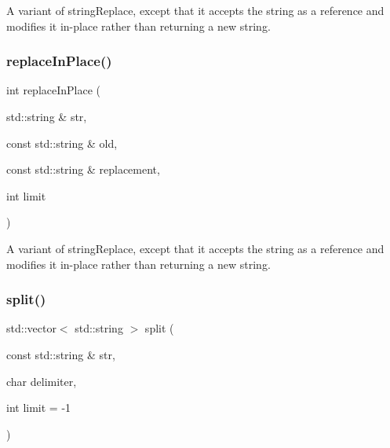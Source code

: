 A variant of string\+Replace, except that it accepts the string as a reference and modifies it in-\/place rather than returning a new string. 

\mbox{\label{namespacesgl_1_1priv_1_1strlib_a96605c78e69e67a8bd3909f7969fe8cf}} 
\subsubsection{\texorpdfstring{replace\+In\+Place()}{replaceInPlace()}\hspace{0.1cm}{\footnotesize\ttfamily [2/2]}}
{\footnotesize\ttfamily int replace\+In\+Place (\begin{DoxyParamCaption}\item[{std\+::string \&}]{str,  }\item[{const std\+::string \&}]{old,  }\item[{const std\+::string \&}]{replacement,  }\item[{int}]{limit }\end{DoxyParamCaption})}



A variant of string\+Replace, except that it accepts the string as a reference and modifies it in-\/place rather than returning a new string. 

\mbox{\label{namespacesgl_1_1priv_1_1strlib_ad26db0032c572d1b848ca89b98cf6cab}} 
\subsubsection{\texorpdfstring{split()}{split()}\hspace{0.1cm}{\footnotesize\ttfamily [1/2]}}
{\footnotesize\ttfamily std\+::vector$<$ std\+::string $>$ split (\begin{DoxyParamCaption}\item[{const std\+::string \&}]{str,  }\item[{char}]{delimiter,  }\item[{int}]{limit = {\ttfamily -\/1} }\end{DoxyParamCaption})}



